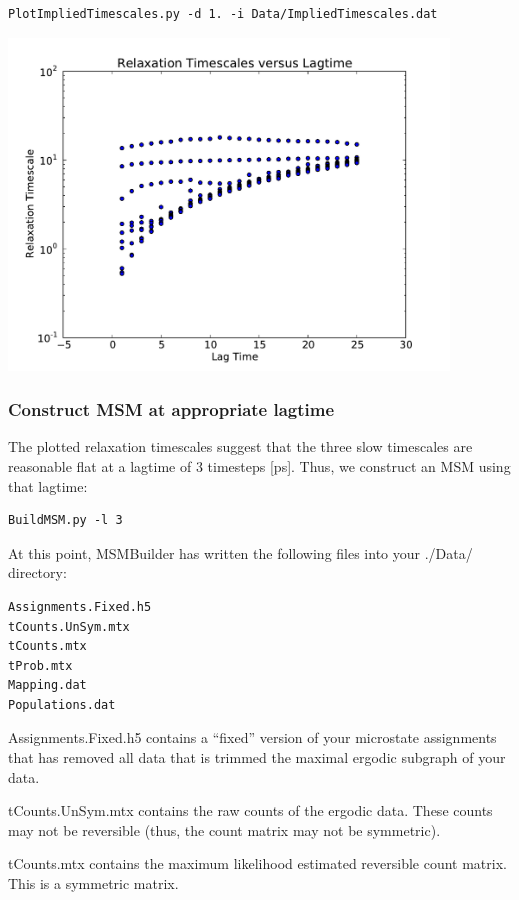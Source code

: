 \documentclass[12pt]{article}
\begin{document}
\begin{verbatim}
PlotImpliedTimescales.py -d 1. -i Data/ImpliedTimescales.dat
\end{verbatim}

\begin{center}
\includegraphics[width=11.7cm]{figures/microstate_timescales.pdf}
\end{center}

\subsubsection{Construct MSM at appropriate lagtime}
The plotted relaxation timescales suggest that the three slow timescales are reasonable flat at a lagtime of 3 timesteps [ps].  Thus, we construct an MSM using that lagtime:

\begin{verbatim}
BuildMSM.py -l 3 
\end{verbatim}

At this point, MSMBuilder has written the following files into your ./Data/ directory:
\begin{verbatim}
Assignments.Fixed.h5
tCounts.UnSym.mtx
tCounts.mtx
tProb.mtx
Mapping.dat
Populations.dat
\end{verbatim}

Assignments.Fixed.h5 contains a “fixed” version of your microstate assignments that has removed all data that is trimmed the maximal ergodic subgraph of your data.  

tCounts.UnSym.mtx contains the raw counts of the ergodic data.  These counts may not be reversible (thus, the count matrix may not be symmetric).  

tCounts.mtx contains the maximum likelihood estimated reversible count matrix.  This is a symmetric matrix.  
\end{document}
